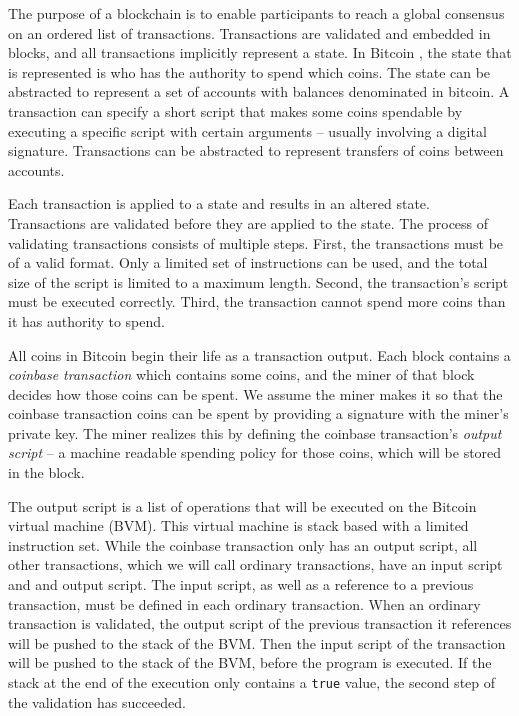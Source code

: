 The purpose of a blockchain is to enable participants to reach a global consensus on an ordered list of transactions. Transactions are validated and embedded in blocks, and all transactions implicitly represent a state. In Bitcoin \cite{bitcoinwhitepaper}, the state that is represented is who has the authority to spend which coins. The state can be abstracted to represent a set of accounts with balances denominated in bitcoin. A transaction can specify a short script that makes some coins spendable by executing a specific script with certain arguments – usually involving a digital signature. Transactions can be abstracted to represent transfers of coins between accounts.

Each transaction is applied to a state and results in an altered state. Transactions are validated before they are applied to the state. The process of validating transactions consists of multiple steps. First, the transactions must be of a valid format. Only a limited set of instructions can be used, and the total size of the script is limited to a maximum length. Second, the transaction's script must be executed correctly. Third, the transaction cannot spend more coins than it has authority to spend.

All coins in Bitcoin begin their life as a transaction output. Each block contains a \emph{coinbase transaction} which contains some coins, and the miner of that block decides how those coins can be spent. We assume the miner makes it so that the coinbase transaction coins can be spent by providing a signature with the miner's private key. The miner realizes this by defining the coinbase transaction's \emph{output script} – a machine readable spending policy for those coins, which will be stored in the block. 

The output script is a list of operations that will be executed on the Bitcoin virtual machine (BVM). This virtual machine is stack based with a limited instruction set. While the coinbase transaction only has an output script, all other transactions, which we will call ordinary transactions, have an input script and and output script. The input script, as well as a reference to a previous transaction, must be defined in each ordinary transaction. When an ordinary transaction is validated, the output script of the previous transaction it references will be pushed to the stack of the BVM. Then the input script of the transaction will be pushed to the stack of the BVM, before the program is executed. If the stack at the end of the execution only contains a \texttt{true} value, the second step of the validation has succeeded. 

